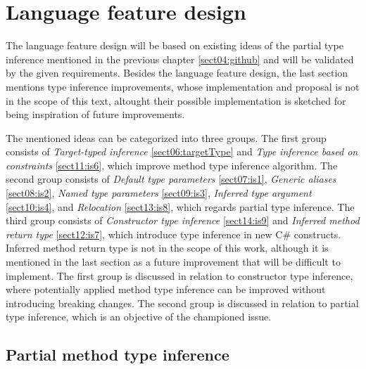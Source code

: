 \chapter{Language feature design}

The language feature design will be based on existing ideas of the partial type inference mentioned in the previous chapter \ref{sect04:github} and will be validated by the given requirements.
Besides the language feature design, the last section mentions type inference improvements, whose implementation and proposal is not in the scope of this text, altought their possible implementation is sketched for being inspiration of future improvements.
\par
The mentioned ideas can be categorized into three groups. 
The first group consists of \textit{Target-typed inference} \ref{sect06:targetType} and \textit{Type inference based on constraints} \ref{sect11:is6}, which improve method type inference algorithm. 
The second group consists of \textit{Default type parameters} \ref{sect07:is1}, \textit{Generic aliases} \ref{sect08:is2}, \textit{Named type parameters} \ref{sect09:is3}, \textit{Inferred type argument} \ref{sect10:is4}, and \textit{Relocation} \ref{sect13:is8}, which regards partial type inference. 
The third group consists of \textit{Constructor type inference} \ref{sect14:is9} and \textit{Inferred method return type} \ref{sect12:is7}, which introduce type inference in new C\# constructs. 
Inferred method return type is not in the scope of this work, although it is mentioned in the last section as a future improvement that will be difficult to implement. 
The first group is discussed in relation to constructor type inference, where potentially applied method type inference can be improved without introducing breaking changes. 
The second group is discussed in relation to partial type inference, which is an objective of the championed issue.

\section{Partial method type inference}

